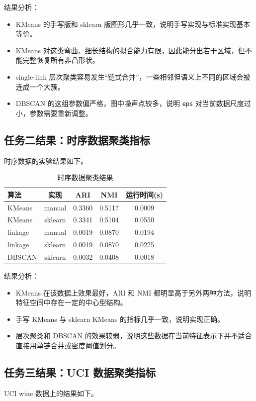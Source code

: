 \documentclass[12pt,a4paper]{ctexart}
\begin{document}
结果分析：
\begin{itemize}
  \item KMeans 的手写版和 sklearn 版图形几乎一致，说明手写实现与标准实现基本等价。
  \item KMeans 对这类弯曲、细长结构的拟合能力有限，因此能分出若干区域，但不能完整恢复所有非凸形状。
  \item single-link 层次聚类容易发生“链式合并”，一些相邻但语义上不同的区域会被连成一个大簇。
  \item DBSCAN 的这组参数偏严格，图中噪声点较多，说明 \texttt{eps} 对当前数据尺度过小，参数需要重新调整。
\end{itemize}

\subsection{任务二结果：时序数据聚类指标}
时序数据的实验结果如下。

\begin{table}[H]
\centering
\caption{时序数据聚类结果}
\label{tab:timeseries}
\begin{tabular}{lcccc}
\toprule
算法 & 实现 & ARI & NMI & 运行时间(s) \\
\midrule
KMeans & manual & 0.3360 & 0.5117 & 0.0009 \\
KMeans & sklearn & 0.3341 & 0.5104 & 0.0550 \\
linkage & manual & 0.0019 & 0.0870 & 0.0194 \\
linkage & sklearn & 0.0019 & 0.0870 & 0.0225 \\
DBSCAN & sklearn & 0.0032 & 0.0408 & 0.0018 \\
\bottomrule
\end{tabular}
\end{table}

结果分析：
\begin{itemize}
  \item KMeans 在该数据上效果最好，ARI 和 NMI 都明显高于另外两种方法，说明特征空间中存在一定的中心型结构。
  \item 手写 KMeans 与 sklearn KMeans 的指标几乎一致，说明实现正确。
  \item 层次聚类和 DBSCAN 的效果较弱，说明这些数据在当前特征表示下并不适合直接用单链合并或密度阈值划分。
\end{itemize}

\subsection{任务三结果：UCI 数据聚类指标}
UCI wine 数据上的结果如下。
\end{document}
